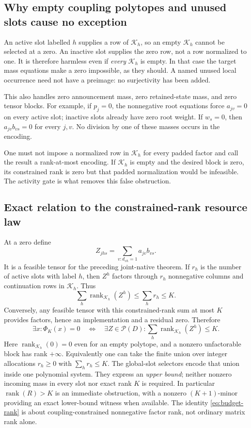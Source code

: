 \subsection{Why empty coupling polytopes and unused slots cause no exception}
An active slot labelled $h$ supplies a row of $\mathcal K_h$, so an empty
$\mathcal K_h$ cannot be selected at a zero. An inactive slot supplies the
zero row, not a row normalized to one. It is therefore harmless even if
\emph{every} $\mathcal K_h$ is empty. In that case the target mass equations
make a zero impossible, as they should. A named unused local occurrence
need not have a preimage: no surjectivity has been added.

This also handles zero announcement mass, zero retained-state mass, and
zero tensor blocks. For example, if $p_j=0$, the nonnegative root equations
force $a_{jv}=0$ on every active slot; inactive slots already have zero root
weight. If $w_s=0$, then $a_{jv}b_{vs}=0$ for every $j,v$.
No division by one of these masses occurs in the encoding.

One must not impose a normalized row in $\mathcal K_h$ for every padded
factor and call the result a rank-at-most encoding. If $\mathcal K_h$ is
empty and the desired block is zero, its constrained rank is zero but that
padded normalization would be infeasible. The activity gate is what removes
this false obstruction.

\subsection{Exact relation to the constrained-rank resource law}
At a zero define
\[
 Z_{jhs}=\sum_{v:d_{vh}=1}a_{jv}b_{vs}.
\]
It is a feasible tensor for the preceding joint-native theorem. If $r_h$
is the number of active slots with label $h$, then
$Z^h$ factors through $r_h$ nonnegative columns and continuation rows in
$\mathcal K_h$. Thus
\[
 \sum_h\operatorname{rank}_{\mathcal K_h}(Z^h)\le\sum_hr_h\le K.
\]
Conversely, any feasible tensor with this constrained-rank sum at most $K$
provides factors, hence an implementation and a residual zero. Therefore
\begin{equation}\label{eq:budget-rank}
 \exists x:\Phi_K(x)=0
 \quad\Longleftrightarrow\quad
 \exists Z\in\mathcal P(D):
 \sum_h\operatorname{rank}_{\mathcal K_h}(Z^h)\le K.
\end{equation}
Here $\operatorname{rank}_{\mathcal K_h}(0)=0$ even for an empty polytope,
and a nonzero unfactorable block has rank $+\infty$.
Equivalently one can take the finite union over integer allocations
$r_h\ge0$ with $\sum_hr_h\le K$. The global-slot selectors encode that union
inside one polynomial system. They express an \emph{upper bound}; neither
nonzero incoming mass in every slot nor exact rank $K$ is required.
In particular $\operatorname{rank}(R)>K$ is an immediate obstruction, with
a nonzero $(K+1)$-minor providing an exact lower-bound witness when available.
The identity \eqref{eq:budget-rank} is about coupling-constrained
nonnegative factor rank, not ordinary matrix rank alone.

